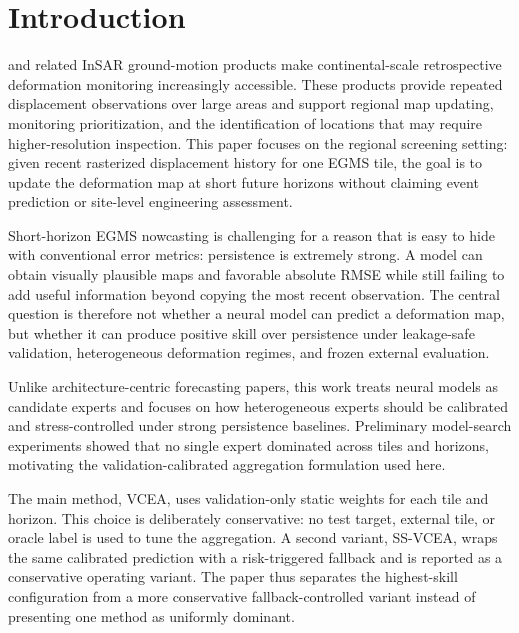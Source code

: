 \documentclass[lettersize,journal]{IEEEtran}
\begin{document}
\section{Introduction}
 and related InSAR ground-motion products make continental-scale retrospective deformation monitoring increasingly accessible. These products provide repeated displacement observations over large areas and support regional map updating, monitoring prioritization, and the identification of locations that may require higher-resolution inspection. This paper focuses on the regional screening setting: given recent rasterized displacement history for one EGMS tile, the goal is to update the deformation map at short future horizons without claiming event prediction or site-level engineering assessment.

Short-horizon EGMS nowcasting is challenging for a reason that is easy to hide with conventional error metrics: persistence is extremely strong. A model can obtain visually plausible maps and favorable absolute RMSE while still failing to add useful information beyond copying the most recent observation. The central question is therefore not whether a neural model can predict a deformation map, but whether it can produce positive skill over persistence under leakage-safe validation, heterogeneous deformation regimes, and frozen external evaluation.

Unlike architecture-centric forecasting papers, this work treats neural models as candidate experts and focuses on how heterogeneous experts should be calibrated and stress-controlled under strong persistence baselines. Preliminary model-search experiments showed that no single expert dominated across tiles and horizons, motivating the validation-calibrated aggregation formulation used here.

The main method, VCEA, uses validation-only static weights for each tile and horizon. This choice is deliberately conservative: no test target, external tile, or oracle label is used to tune the aggregation. A second variant, SS-VCEA, wraps the same calibrated prediction with a risk-triggered fallback and is reported as a conservative operating variant. The paper thus separates the highest-skill configuration from a more conservative fallback-controlled variant instead of presenting one method as uniformly dominant.
\end{document}
